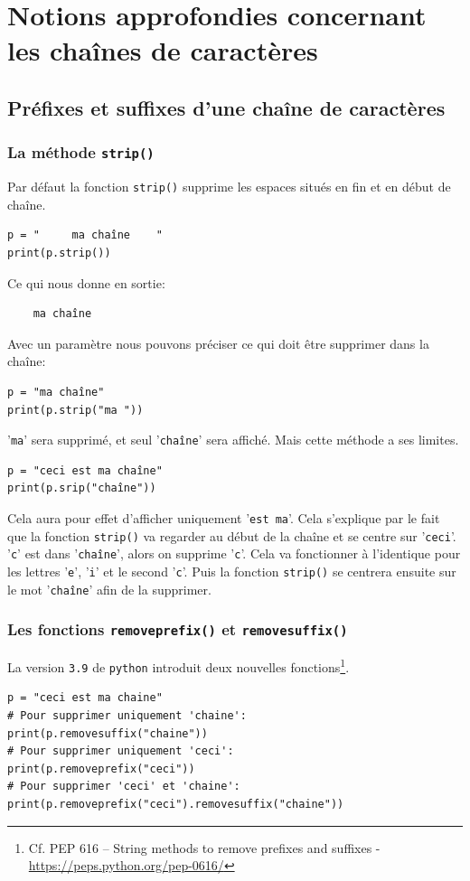 \documentclass[a4paper,11pt]{book}
\begin{document}
\chapter{Notions approfondies concernant les chaînes de caractères}
\section{Préfixes et suffixes d'une chaîne de caractères}
\subsection*{La méthode \texttt{strip()}}
Par défaut la fonction \texttt{strip()} supprime les espaces situés en fin et en début de chaîne.
\begin{lstlisting}
p = "     ma chaîne    "
print(p.strip())
\end{lstlisting}
\medskip

Ce qui nous donne en sortie:
\begin{verbatim}
    ma chaîne
\end{verbatim}
\medskip

Avec un paramètre nous pouvons préciser ce qui doit être supprimer dans la chaîne:
\begin{lstlisting}
p = "ma chaîne"
print(p.strip("ma "))
\end{lstlisting}
\medskip

'\texttt{ma}' sera supprimé, et seul '\texttt{chaîne}' sera affiché. Mais cette méthode a ses limites.
\begin{lstlisting}
p = "ceci est ma chaîne"
print(p.srip("chaîne"))
\end{lstlisting}
\medskip

Cela aura pour effet d'afficher uniquement '\texttt{est ma}'. Cela s'explique par le fait que la fonction \texttt{strip()} va regarder au début de la chaîne et se centre sur '\texttt{ceci}'. '\texttt{c}' est dans '\texttt{chaîne}', alors on supprime '\texttt{c}'. Cela va fonctionner à l'identique pour les lettres '\texttt{e}', '\texttt{i}' et le second '\texttt{c}'. Puis la fonction \texttt{strip()} se centrera ensuite sur le mot '\texttt{chaîne}' afin de la supprimer.
\medskip

\subsection*{Les fonctions \texttt{removeprefix()} et \texttt{removesuffix()}}\label{prefix_suffix}
La version \texttt{3.9} de \texttt{python} introduit deux nouvelles fonctions\footnote{Cf. PEP 616 – String methods to remove prefixes and suffixes - \url{https://peps.python.org/pep-0616/}}.
\begin{lstlisting}
p = "ceci est ma chaine"
# Pour supprimer uniquement 'chaine':
print(p.removesuffix("chaine"))
# Pour supprimer uniquement 'ceci':
print(p.removeprefix("ceci"))
# Pour supprimer 'ceci' et 'chaine':
print(p.removeprefix("ceci").removesuffix("chaine"))
\end{lstlisting}
\medskip
\end{document}
